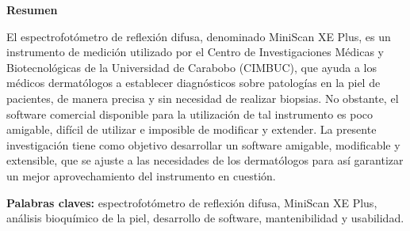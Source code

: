 \begin{center}
	\membrete
	\vfill
	\textbf{Resumen}
\end{center}

	\noindent
El espectrofot\'{o}metro de reflexi\'{o}n difusa, denominado MiniScan XE Plus, es un instrumento de medici\'{o}n utilizado por el Centro de Investigaciones M\'{e}dicas y Biotecnol\'{o}gicas de la Universidad de Carabobo (CIMBUC), que ayuda a los m\'{e}dicos dermat\'{o}logos a establecer diagn\'{o}sticos sobre patolog\'{i}as en la piel de pacientes, de manera precisa y sin necesidad de realizar biopsias. No obstante, el software comercial disponible para la utilizaci\'{o}n de tal instrumento es poco amigable, dif\'{i}cil de utilizar e imposible de modificar y extender. La presente investigaci\'{o}n tiene como objetivo desarrollar un software amigable, modificable y extensible, que se ajuste a las necesidades de los dermat\'{o}logos para as\'{i} garantizar un mejor aprovechamiento del instrumento en cuesti\'{o}n.

	\noindent
	\textbf{Palabras claves:} espectrofot\'{o}metro de reflexi\'{o}n difusa, MiniScan XE Plus, an\'{a}lisis bioqu\'{i}mico de la piel, desarrollo de software, mantenibilidad y usabilidad.

\vfill
\begin{minipage}[t]{0.45\textwidth}
	\begin{flushleft}
		\begin{center}
			\autor
		\end{center}
	\end{flushleft}
\end{minipage}
\begin{minipage}[t]{0.45\textwidth}
	\begin{flushright}
		\begin{center}
			\tutores
		\end{center}
	\end{flushright}
\end{minipage}
\vfill